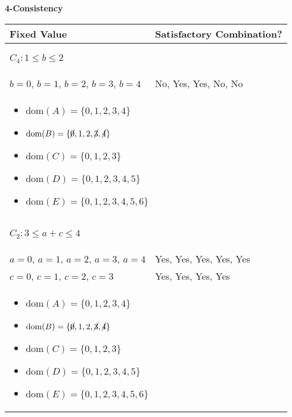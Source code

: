 \begin{example} \textbf{4-Consistency}
    \begin{center}
        \begin{tabular}{ll}
            \textbf{Fixed Value} & \textbf{Satisfactory Combination?} \\
            \toprule
            \multicolumn{2}{p{\linewidth}}{
            \begin{center}
                $C_4: 1 \leq b \leq 2$
            \end{center}} \\
            \midrule
                $b = 0$, $b=1$, $b=2$, $b=3$, $b=4$ & No, Yes, Yes, No, No \\
            \multicolumn{2}{p{\linewidth}}{
            \begin{itemize}
                \item $\text{dom}(A) = \{0, 1, 2, 3, 4\}$
                \item $\text{dom}(B) = \{\cancel{0}, 1, 2, \cancel{3}, \cancel{4}\} $
                \item $\text{dom}(C) = \{0, 1, 2, 3\} $
                \item $\text{dom}(D) = \{0, 1, 2, 3, 4, 5\} $
                \item $\text{dom}(E) = \{0, 1, 2, 3, 4, 5, 6\} $
            \end{itemize}} \\
            \midrule
            \multicolumn{2}{p{\linewidth}}{
            \begin{center}
                $C_2: 3 \leq a + c \leq 4$
            \end{center}} \\
            \midrule
                $a=0$, $a=1$, $a=2$, $a=3$, $a=4$ & Yes, Yes, Yes, Yes, Yes \\
                $c=0$, $c=1$, $c=2$, $c=3$ & Yes, Yes, Yes, Yes \\
            \multicolumn{2}{p{\linewidth}}{
            \begin{itemize}
                \item $\text{dom}(A) = \{0, 1, 2, 3, 4\}$
                \item $\text{dom}(B) = \{\cancel{0}, 1, 2, \cancel{3}, \cancel{4}\} $
                \item $\text{dom}(C) = \{0, 1, 2, 3\} $
                \item $\text{dom}(D) = \{0, 1, 2, 3, 4, 5\} $
                \item $\text{dom}(E) = \{0, 1, 2, 3, 4, 5, 6\} $

\end{itemize}}
\end{tabular}
\end{center}
\end{example}
